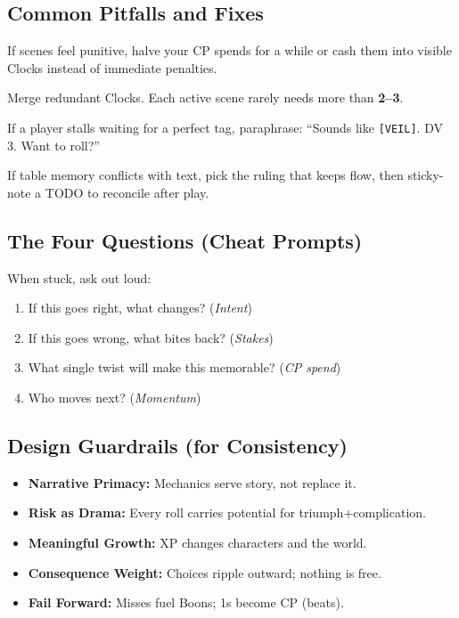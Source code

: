 \subsection{Common Pitfalls and Fixes}
\begin{description}[leftmargin=1.5em, style=nextline]
  \item[Over-cranking CP:] If scenes feel punitive, halve your CP spends for a while or cash them into visible Clocks instead of immediate penalties.
  \item[Clock Sprawl:] Merge redundant Clocks. Each active scene rarely needs more than \textbf{2--3}.
  \item[Tag Paralysis:] If a player stalls waiting for a perfect tag, paraphrase: ``Sounds like \texttt{[VEIL]}. DV 3. Want to roll?''
  \item[Rules Drift:] If table memory conflicts with text, pick the ruling that keeps flow, then sticky-note a TODO to reconcile after play.
\end{description}

\subsection{The Four Questions (Cheat Prompts)}
When stuck, ask out loud:
\begin{enumerate}
  \item If this goes right, what changes? (\emph{Intent})
  \item If this goes wrong, what bites back? (\emph{Stakes})
  \item What single twist will make this memorable? (\emph{CP spend})
  \item Who moves next? (\emph{Momentum})
\end{enumerate}

\subsection{Design Guardrails (for Consistency)}
\begin{itemize}
  \item \textbf{Narrative Primacy:} Mechanics serve story, not replace it.
  \item \textbf{Risk as Drama:} Every roll carries potential for triumph+complication.
  \item \textbf{Meaningful Growth:} XP changes characters and the world.
  \item \textbf{Consequence Weight:} Choices ripple outward; nothing is free.
  \item \textbf{Fail Forward:} Misses fuel Boons; 1s become CP (beats).
\end{itemize}

